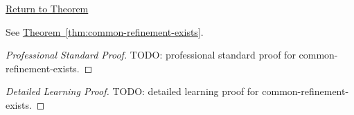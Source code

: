 \newpage
{}
\label{prf:common-refinement-exists}

\begin{remark*}[Return]
\hyperref[thm:common-refinement-exists]{Return to Theorem}
\end{remark*}

\begin{theorem*}
See \hyperref[thm:common-refinement-exists]{Theorem~\ref*{thm:common-refinement-exists}}.
\end{theorem*}

\begin{proof}[Professional Standard Proof]
\LRAProofBodyStart
TODO: professional standard proof for common-refinement-exists.
\end{proof}

\begin{proof}[Detailed Learning Proof]
\LRAProofBodyStart
TODO: detailed learning proof for common-refinement-exists.
\end{proof}

\begin{remark*}
\end{remark*}

\begin{dependencies}
\NoLocalDependencies
\end{dependencies}

\clearpage

